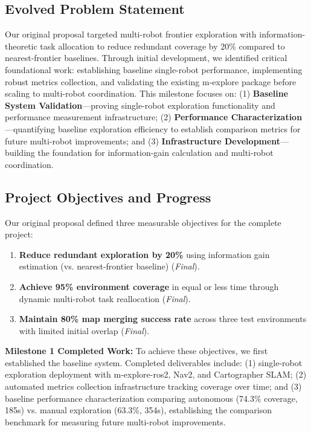 \documentclass[conference]{IEEEtran}
\begin{document}
\subsection{Evolved Problem Statement}

Our original proposal targeted multi-robot frontier exploration with information-theoretic task allocation to reduce redundant coverage by 20\% compared to nearest-frontier baselines. Through initial development, we identified critical foundational work: establishing baseline single-robot performance, implementing robust metrics collection, and validating the existing m-explore package before scaling to multi-robot coordination. This milestone focuses on: (1) \textbf{Baseline System Validation}—proving single-robot exploration functionality and performance measurement infrastructure; (2) \textbf{Performance Characterization}—quantifying baseline exploration efficiency to establish comparison metrics for future multi-robot improvements; and (3) \textbf{Infrastructure Development}—building the foundation for information-gain calculation and multi-robot coordination.

\subsection{Project Objectives and Progress}

Our original proposal defined three measurable objectives for the complete project:

\begin{enumerate}
\item \textbf{Reduce redundant exploration by 20\%} using information gain estimation (vs. nearest-frontier baseline) (\textit{Final}).

\item \textbf{Achieve 95\% environment coverage} in equal or less time through dynamic multi-robot task reallocation (\textit{Final}).

\item \textbf{Maintain 80\% map merging success rate} across three test environments with limited initial overlap (\textit{Final}).
\end{enumerate}

\textbf{Milestone 1 Completed Work:} To achieve these objectives, we first established the baseline system. Completed deliverables include: (1) single-robot exploration deployment with m-explore-ros2, Nav2, and Cartographer SLAM; (2) automated metrics collection infrastructure tracking coverage over time; and (3) baseline performance characterization comparing autonomous (74.3\% coverage, 185s) vs. manual exploration (63.3\%, 354s), establishing the comparison benchmark for measuring future multi-robot improvements.
\end{document}
